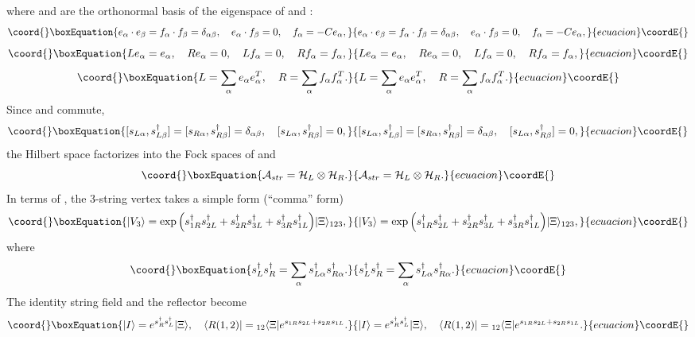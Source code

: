 \documentclass[a4paper,12pt]{article}
\def\cob{\delta}
\def\bra{\langle}
\def\ket{\rangle}
\def\bt{\beta}
\def\al{\alpha}
\def\tens{\otimes}
\def\sd{s^{\dagger}}
\begin{document}
where \myHighlight{$e_{\al}$}\coordHE{} and \myHighlight{$f_{\al}$}\coordHE{} are the orthonormal basis of the eigenspace
of \coordHE{} and \coordHE{}:
\begin{equation}\coord{}\boxEquation{
 e_{\al}\cdot e_{\bt}=f_{\al}\cdot f_{\bt}=\cob_{\al\bt},\quad
e_{\al}\cdot f_{\bt}=0,\quad f_{\al}=-Ce_{\al},
}{
 e_{\al}\cdot e_{\bt}=f_{\al}\cdot f_{\bt}=\cob_{\al\bt},\quad
e_{\al}\cdot f_{\bt}=0,\quad f_{\al}=-Ce_{\al},
}{ecuacion}\coordE{}\end{equation}
\begin{equation}\coord{}\boxEquation{
 Le_{\al}=e_{\al},\quad Re_{\al}=0,\quad Lf_{\al}=0,\quad Rf_{\al}=f_{\al},
}{
 Le_{\al}=e_{\al},\quad Re_{\al}=0,\quad Lf_{\al}=0,\quad Rf_{\al}=f_{\al},
}{ecuacion}\coordE{}\end{equation}
\begin{equation}\coord{}\boxEquation{
 L=\sum_{\al}e_{\al}e_{\al}^T,\quad R=\sum_{\al}f_{\al}f_{\al}^T.
}{
 L=\sum_{\al}e_{\al}e_{\al}^T,\quad R=\sum_{\al}f_{\al}f_{\al}^T.
}{ecuacion}\coordE{}\end{equation}
Since \coordHE{} and \coordHE{} commute,
\begin{equation}\coord{}\boxEquation{
 [s_{L\al},\sd_{L\bt}]=[s_{R\al},\sd_{R\bt}]=\cob_{\al\bt},\quad
[s_{L\al},\sd_{R\bt}]=0,
}{
 [s_{L\al},\sd_{L\bt}]=[s_{R\al},\sd_{R\bt}]=\cob_{\al\bt},\quad
[s_{L\al},\sd_{R\bt}]=0,
}{ecuacion}\coordE{}\end{equation}
the Hilbert space factorizes into the Fock spaces of \coordHE{} and \coordHE{}
\begin{equation}\coord{}\boxEquation{
{\cal A}_{str}={\cal H}_L\tens {\cal H}_R.
}{
{\cal A}_{str}={\cal H}_L\tens {\cal H}_R.
}{ecuacion}\coordE{}\end{equation}
In terms of \coordHE{}, the 3-string vertex takes a simple
form (``comma'' form)
\begin{equation}\coord{}\boxEquation{
|V_3\ket=\exp\Big(\sd_{1R}\sd_{2L}+\sd_{2R}\sd_{3L}+\sd_{3R}\sd_{1L}
\Big)|\Xi\ket_{123} ,
}{
|V_3\ket=\exp\Big(\sd_{1R}\sd_{2L}+\sd_{2R}\sd_{3L}+\sd_{3R}\sd_{1L}
\Big)|\Xi\ket_{123} ,
}{ecuacion}\coordE{}\end{equation}
where
\begin{equation}\coord{}\boxEquation{
 \sd_L\sd_R=\sum_{\al}\sd_{L\al}\sd_{R\al}.
}{
 \sd_L\sd_R=\sum_{\al}\sd_{L\al}\sd_{R\al}.
}{ecuacion}\coordE{}\end{equation}
The identity string field and the reflector become
\begin{equation}\coord{}\boxEquation{
|I\ket=e^{\sd_R\sd_L}|\Xi\ket,\quad 
\bra R(1,2)|={}_{12}\bra\Xi|e^{s_{1R}s_{2L}+s_{2R}s_{1L}}. 
}{
|I\ket=e^{\sd_R\sd_L}|\Xi\ket,\quad 
\bra R(1,2)|={}_{12}\bra\Xi|e^{s_{1R}s_{2L}+s_{2R}s_{1L}}. 
}{ecuacion}\coordE{}\end{equation}
\end{document}
